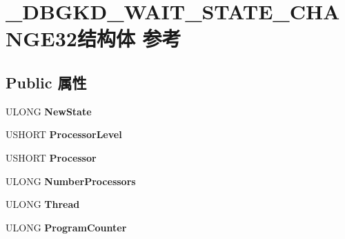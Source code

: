 \hypertarget{struct___d_b_g_k_d___w_a_i_t___s_t_a_t_e___c_h_a_n_g_e32}{}\section{\+\_\+\+D\+B\+G\+K\+D\+\_\+\+W\+A\+I\+T\+\_\+\+S\+T\+A\+T\+E\+\_\+\+C\+H\+A\+N\+G\+E32结构体 参考}
\label{struct___d_b_g_k_d___w_a_i_t___s_t_a_t_e___c_h_a_n_g_e32}
\subsection*{Public 属性}
\begin{DoxyCompactItemize}
\item 
\mbox{\label{struct___d_b_g_k_d___w_a_i_t___s_t_a_t_e___c_h_a_n_g_e32_a60cab13c1715f27fe5c6dc164bb63402}} 
U\+L\+O\+NG {\bfseries New\+State}
\item 
\mbox{\label{struct___d_b_g_k_d___w_a_i_t___s_t_a_t_e___c_h_a_n_g_e32_af87f00165e8ea75761ae2013f6eb7a29}} 
U\+S\+H\+O\+RT {\bfseries Processor\+Level}
\item 
\mbox{\label{struct___d_b_g_k_d___w_a_i_t___s_t_a_t_e___c_h_a_n_g_e32_acb77f188455d6aa4226e8399abd7cc09}} 
U\+S\+H\+O\+RT {\bfseries Processor}
\item 
\mbox{\label{struct___d_b_g_k_d___w_a_i_t___s_t_a_t_e___c_h_a_n_g_e32_af5fa0a0b14e590b3ee495f57dcd23643}} 
U\+L\+O\+NG {\bfseries Number\+Processors}
\item 
\mbox{\label{struct___d_b_g_k_d___w_a_i_t___s_t_a_t_e___c_h_a_n_g_e32_aa0e3ac38d53e8204a2779448a92483b7}} 
U\+L\+O\+NG {\bfseries Thread}
\item 
\mbox{\label{struct___d_b_g_k_d___w_a_i_t___s_t_a_t_e___c_h_a_n_g_e32_ab000ffb1eebac326f46a2aa6463f392d}} 
U\+L\+O\+NG {\bfseries Program\+Counter}

\end{DoxyCompactItemize}
